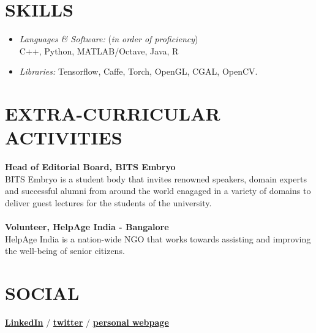 \documentclass[margin, 10pt]{res} %
\begin{document}
\begin{resume}
\section{SKILLS} 

\begin{itemize}
\item {\sl Languages \& Software:} {(\it in order of proficiency}) \\
 C++, Python, MATLAB/Octave, Java, R
\item {\sl Libraries:} Tensorflow, Caffe, Torch, OpenGL, CGAL, OpenCV.
\end{itemize}


\section{EXTRA-CURRICULAR \\ ACTIVITIES} 

\textbf{Head of Editorial Board, BITS Embryo} \\
BITS Embryo is a student body that invites renowned speakers, domain experts and successful alumni from around the world enagaged in a variety of domains to deliver guest lectures for the students of the university.\\ \\
\textbf{ Volunteer, HelpAge India - Bangalore} \\
HelpAge India is a nation-wide NGO that works towards assisting and improving the well-being of senior citizens.


\section{SOCIAL \\}
\href{https://www.linkedin.com/in/adityachivukula}{\textbf{LinkedIn}} /
\href{https://twitter.com/adityachivu}{\textbf{twitter}} /
\href{https://adityachivu.github.io/}{\textbf{personal webpage}} 



\end{resume}
\end{document}
